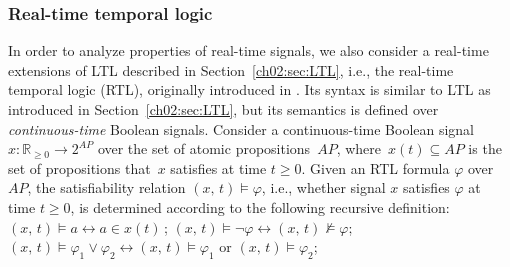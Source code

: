 \subsubsection{Real-time temporal logic}\label{ch03:sec:RTL}
In order to analyze properties of real-time signals, we also consider a real-time extensions of LTL described in Section~\ref{ch02:sec:LTL}, i.e., the real-time temporal logic (RTL), originally introduced in \cite{reynolds2001continuous}.
Its syntax is similar to LTL as introduced in Section~\ref{ch02:sec:LTL}, but its semantics is defined over \emph{continuous-time} Boolean signals. Consider a continuous-time Boolean signal $x:\mathbb{R}_{\geq 0}\rightarrow 2^{AP}$ over the set of atomic propositions~$AP$, where~$x(t)\subseteq AP$ is the set of propositions that~$x$ satisfies at time $t\geq 0$.
Given an RTL formula $\varphi$ over $AP$, the satisfiability relation $(x,\, t)\models \varphi$, i.e., whether signal $x$ satisfies $\varphi$ at time $t\geq 0$, is determined according to the following recursive definition:
$(x,\,t)\models a  \leftrightarrow  a\in x(t)\, $; $(x,\,t)\models \neg \varphi   \leftrightarrow  (x,\, t) \nvDash \varphi$; $(x,\,t)\models \varphi_1 \vee \varphi_2  \leftrightarrow   (x,\,t)\models \varphi_1 \,\, \text{or}\,\,  (x,\,t)\models \varphi_2 $;
